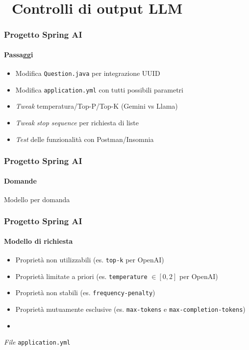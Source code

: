 \section{\faWrench\ Controlli di output LLM} %
\label{sec:spring-ai-gemini-llm-output-controls}
%
\begin{frame}[t,fragile] \frametitle{Progetto Spring AI}
    \framesubtitle{Passaggi}
    {\small
        \begin{itemize}[leftmargin=10pt,align=right]
            \item[\alertedcircled{1}] Modifica \texttt{Question.java} per integrazione UUID
		    \item[\alertedcircled{2}] Modifica \texttt{application.yml} con tutti possibili parametri
            \item[\alertedcircled{3}] \textit{Tweak} temperatura/Top-P/Top-K (Gemini vs Llama)
            \item[\alertedcircled{4}] \textit{Tweak} \textit{stop sequence} per richiesta di liste
            \item[\alertedcircled{5}] \textit{Test} delle funzionalità con Postman/Insomnia
        \end{itemize}
    }
\end{frame}
%
\begin{frame}[t,fragile] \frametitle{Progetto Spring AI}
    \framesubtitle{Domande}
        \begin{block}{Modello per domanda}
			{\tiny}
    	\end{block}
\end{frame}
%
\begin{frame}[t,fragile] \frametitle{Progetto Spring AI}
    \framesubtitle{Modello di richiesta}
    {\footnotesize
        \begin{itemize}[leftmargin=10pt,align=right]
		    \item[\alert{\faExclamationTriangle}] Proprietà non utilizzabili (es. \texttt{top-k} per OpenAI)
		    \item[\alert{\faExclamationTriangle}] Proprietà limitate a priori (es. \texttt{temperature} $\in [0, 2]$ per OpenAI)
            \item[\alert{\faExclamationTriangle}] Proprietà non stabili (es. \texttt{frequency-penalty})
		    \item[\alert{\faExclamationTriangle}] Proprietà mutuamente esclusive (es. \texttt{max-tokens} e \texttt{max-completion-tokens})
		    \item[] 
        \end{itemize}
        \vspace*{-.3cm}
        \begin{block}{\textit{File} \texttt{application.yml}}
			{\tiny}
    	\end{block}
    }
\end{frame}

